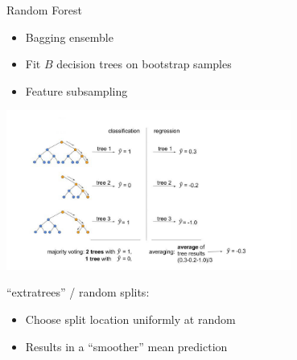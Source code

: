 \documentclass[11pt,compress,t,notes=noshow, xcolor=table]{beamer}
\begin{document}
\begin{frame}{Random Forest}

\begin{itemize}
    \item Bagging ensemble
    \item Fit $B$ decision trees on bootstrap samples
    \item Feature subsampling
\end{itemize}

\begin{center}
  \includegraphics[width = 0.7\textwidth]{figure_man/random_forests.jpg}
\end{center}

\enquote{extratrees} / random splits:\\
\begin{itemize}
  \item Choose split location uniformly at random
  \item Results in a \enquote{smoother} mean prediction
\end{itemize}

\end{frame}
\end{document}
